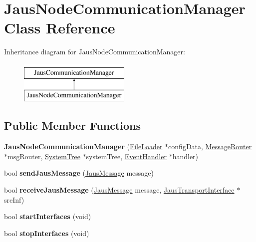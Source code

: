 \hypertarget{class_jaus_node_communication_manager}{\section{\-Jaus\-Node\-Communication\-Manager \-Class \-Reference}
\label{class_jaus_node_communication_manager}
}
\-Inheritance diagram for \-Jaus\-Node\-Communication\-Manager\-:\begin{figure}[H]
\begin{center}
\leavevmode
\includegraphics[height=2.000000cm]{class_jaus_node_communication_manager}
\end{center}
\end{figure}
\subsection*{\-Public \-Member \-Functions}
\begin{DoxyCompactItemize}
\item 
\hypertarget{class_jaus_node_communication_manager_a1edadfd71559c09db4d25337b461ad62}{{\bfseries \-Jaus\-Node\-Communication\-Manager} (\hyperlink{class_file_loader}{\-File\-Loader} $\ast$config\-Data, \hyperlink{class_message_router}{\-Message\-Router} $\ast$msg\-Router, \hyperlink{class_system_tree}{\-System\-Tree} $\ast$system\-Tree, \hyperlink{class_event_handler}{\-Event\-Handler} $\ast$handler)}\label{class_jaus_node_communication_manager_a1edadfd71559c09db4d25337b461ad62}

\item 
\hypertarget{class_jaus_node_communication_manager_ae7bc0673c1f666e5d95c3351181b8031}{bool {\bfseries send\-Jaus\-Message} (\hyperlink{struct_jaus_message_struct}{\-Jaus\-Message} message)}\label{class_jaus_node_communication_manager_ae7bc0673c1f666e5d95c3351181b8031}

\item 
\hypertarget{class_jaus_node_communication_manager_a1276d433e5ceb2531c99ba553cec5326}{bool {\bfseries receive\-Jaus\-Message} (\hyperlink{struct_jaus_message_struct}{\-Jaus\-Message} message, \hyperlink{class_jaus_transport_interface}{\-Jaus\-Transport\-Interface} $\ast$src\-Inf)}\label{class_jaus_node_communication_manager_a1276d433e5ceb2531c99ba553cec5326}

\item 
\hypertarget{class_jaus_node_communication_manager_ab7ed4fd323e589a0f86935b7ddbf931f}{bool {\bfseries start\-Interfaces} (void)}\label{class_jaus_node_communication_manager_ab7ed4fd323e589a0f86935b7ddbf931f}

\item 
\hypertarget{class_jaus_node_communication_manager_afcd96d2b6d337c801e52b6be300bede7}{bool {\bfseries stop\-Interfaces} (void)}\label{class_jaus_node_communication_manager_afcd96d2b6d337c801e52b6be300bede7}

\end{DoxyCompactItemize}
